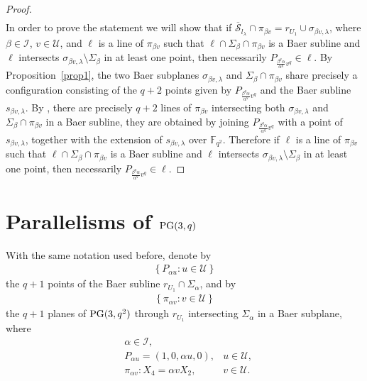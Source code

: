 \documentclass[11pt]{article}
\theoremstyle{definition}
\numberwithin{equation}{section}
\def\cI{\mathcal I}
\def\cU{\mathcal U}
\def\cS{\mathcal S}
\def\PG{{\rm PG}}
\def\F{{\mathbb F}}
\begin{document}
\begin{proof}
\begin{align*}
\end{align*} 
In order to prove the statement we will show that if $\overline{\cS}_{l_\lambda}  \cap \pi_{\beta v} = r_{U_1} \cup \sigma_{\beta v, \lambda}$, where $\beta \in \cI$, $v \in \cU$, and $\ell$ is a line of $\pi_{\beta v}$ such that $\ell \cap \Sigma_{\beta} \cap \pi_{\beta v}$ is a Baer subline and $\ell$ intersects $\sigma_{\beta v, \lambda} \setminus \Sigma_{\beta}$ in at least one point, then necessarily $P_{\frac{\beta^q \alpha}{\alpha^q} v^q} \in \ell$. By Proposition~\ref{prop1}, the two Baer subplanes $\sigma_{\beta v, \lambda}$ and $\Sigma_{\beta} \cap \pi_{\beta v}$ share precisely a configuration consisting of the $q+2$ points given by $P_{\frac{\beta^q \alpha}{\alpha^q} v^q}$ and the Baer subline $s_{\beta v, \lambda}$. By \cite{bose1980intersection}, there are precisely $q+2$ lines of $\pi_{\beta v}$ intersecting both $\sigma_{\beta v, \lambda}$ and $\Sigma_{\beta} \cap \pi_{\beta v}$ in a Baer subline, they are obtained by joining $P_{\frac{\beta^q \alpha}{\alpha^q} v^q}$ with a point of $s_{\beta v, \lambda}$, together with the extension of $s_{\beta v, \lambda}$ over $\F_{q^2}$. Therefore if $\ell$ is a line of $\pi_{\beta v}$ such that $\ell \cap \Sigma_{\beta} \cap \pi_{\beta v}$ is a Baer subline and $\ell$ intersects $\sigma_{\beta v, \lambda} \setminus \Sigma_{\beta}$ in at least one point, then necessarily $P_{\frac{\beta^q \alpha}{\alpha^q} v^q} \in \ell$.
\end{proof}





\section{Parallelisms of \texorpdfstring{$\PG(3, q)$}{PG(3, q)}}

With the same notation used before, denote by 
\begin{align*}
\left\{P_{\alpha u} \colon u \in \cU\right\}
\end{align*}
the $q+1$ points of the Baer subline $r_{U_1} \cap \Sigma_{\alpha}$, and by 
\begin{align*}
\left\{\pi_{\alpha v} \colon v \in \cU\right\}
\end{align*}
the $q+1$ planes of $\PG(3, q^2)$ through $r_{U_1}$ intersecting $\Sigma_{\alpha}$ in a Baer subplane, where
\begin{align*}
&  \alpha \in \cI, \\
& P_{\alpha u} = (1,0,\alpha u, 0), & u \in \cU, \\
& \pi_{\alpha v}: X_4 = \alpha v X_2, & v \in \cU.
\end{align*}
\end{document}
